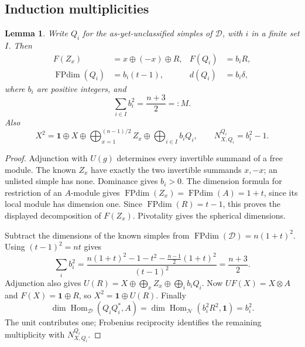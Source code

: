 \documentclass[11pt]{article}
\newtheorem{lemma}[theorem]{Lemma}
\newcommand{\one}{\mathbf1}\newcommand{\D}{\mathcal D}\newcommand{\Dcat}{\mathcal D}
\newcommand{\FP}{\operatorname{FPdim}}\newcommand{\Irr}{\operatorname{Irr}}
\newcommand{\Hom}{\operatorname{Hom}}\newcommand{\id}{\operatorname{id}}
\newcommand{\N}{\mathcal N}\newcommand{\F}{\mathcal F}
\numberwithin{equation}{section}
\begin{document}
\subsection{Induction multiplicities}
\begin{lemma}\label{B:multiplicities}
Write $Q_i$ for the as-yet-unclassified simples of $\D$, with $i$ in a finite set $I$. Then
\begin{align}
 F(Z_x)&=x\oplus(-x)\oplus R, & F(Q_i)&=b_iR,\\
 \FP(Q_i)&=b_i(t-1), & d(Q_i)&=b_i\delta,
\end{align}
where $b_i$ are positive integers, and
\begin{equation}\label{B:squares}
 \sum_{i\in I}b_i^2=\frac{n+3}{2}=:M.
\end{equation}
Also
\begin{equation}\label{B:XX}
 X^2=\one\oplus X\oplus\bigoplus_{x=1}^{(n-1)/2}Z_x
          \oplus\bigoplus_{i\in I} b_iQ_i,
 \qquad N_{X,Q_i}^{Q_i}=b_i^2-1.
\end{equation}
\end{lemma}
\begin{proof}
Adjunction with $U(g)$ determines every invertible summand of a free module. The known $Z_x$ have exactly the two invertible summands $x,-x$; an unlisted simple has none. Dominance gives $b_i>0$. The dimension formula for restriction of an $A$-module gives $\FP(Z_x)=\FP(A)=1+t$, since its local module has dimension one. Since $\FP(R)=t-1$, this proves the displayed decomposition of $F(Z_x)$. Pivotality gives the spherical dimensions.

Subtract the dimensions of the known simples from $\FP(\D)=n(1+t)^2$. Using $(t-1)^2=nt$ gives
\[
 \sum_i b_i^2=
 \frac{n(1+t)^2-1-t^2-\frac{n-1}{2}(1+t)^2}{(t-1)^2}
 =\frac{n+3}{2}.
\]
Adjunction also gives
$U(R)=X\oplus\bigoplus_x Z_x\oplus\bigoplus_i b_iQ_i$.
Now $UF(X)=X\otimes A$ and $F(X)=\one\oplus R$, so $X^2=\one\oplus U(R)$. Finally
\[
 \dim\Hom_{\D}(Q_iQ_i^*,A)
 =\dim\Hom_{\N}(b_i^2R^2,\one)=b_i^2.
\]
The unit contributes one; Frobenius reciprocity identifies the remaining multiplicity with $N_{X,Q_i}^{Q_i}$.
\end{proof}
\end{document}
